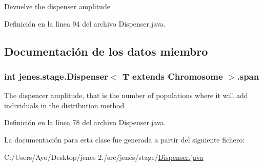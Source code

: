 \begin{DoxyReturn}{Devuelve}
the dispenser amplitude 
\end{DoxyReturn}


Definición en la línea 94 del archivo Dispenser.\-java.



\subsection{Documentación de los datos miembro}
\hypertarget{classjenes_1_1stage_1_1_dispenser_3_01_t_01extends_01_chromosome_01_4_a8f9bc0997e0536729db0c55bc9e240a5}{
\subsubsection[{span}]{\setlength{\rightskip}{0pt plus 5cm}int jenes.\-stage.\-Dispenser$<$ T extends Chromosome $>$.span\hspace{0.3cm}{\ttfamily [protected]}}}\label{classjenes_1_1stage_1_1_dispenser_3_01_t_01extends_01_chromosome_01_4_a8f9bc0997e0536729db0c55bc9e240a5}
The dispencer amplitude, that is the number of populations where it will add individuals in the distribution method 

Definición en la línea 78 del archivo Dispenser.\-java.



La documentación para esta clase fue generada a partir del siguiente fichero\-:\begin{DoxyCompactItemize}
\item 
C\-:/\-Users/\-Ayo/\-Desktop/jenes 2./src/jenes/stage/\hyperlink{_dispenser_8java}{Dispenser.\-java}\end{DoxyCompactItemize}
